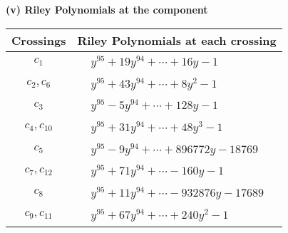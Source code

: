 \documentclass[1p]{elsarticle_modified}
\theoremstyle{definition}
\begin{document}
\newpage\renewcommand{\arraystretch}{1}
\flushleft \textbf{(v) Riley Polynomials at the component}\newline \\
\begin{tabular}{m{50pt}|m{274pt}}
Crossings & \hspace{64pt}Riley Polynomials at each crossing \\
\hline $$\begin{aligned}c_{1}\end{aligned}$$&$\begin{aligned}
&y^{95}+19 y^{94}+\cdots+16 y-1
\end{aligned}$\\
\hline $$\begin{aligned}c_{2},c_{6}\end{aligned}$$&$\begin{aligned}
&y^{95}+43 y^{94}+\cdots+8 y^2-1
\end{aligned}$\\
\hline $$\begin{aligned}c_{3}\end{aligned}$$&$\begin{aligned}
&y^{95}-5 y^{94}+\cdots+128 y-1
\end{aligned}$\\
\hline $$\begin{aligned}c_{4},c_{10}\end{aligned}$$&$\begin{aligned}
&y^{95}+31 y^{94}+\cdots+48 y^3-1
\end{aligned}$\\
\hline $$\begin{aligned}c_{5}\end{aligned}$$&$\begin{aligned}
&y^{95}-9 y^{94}+\cdots+896772 y-18769
\end{aligned}$\\
\hline $$\begin{aligned}c_{7},c_{12}\end{aligned}$$&$\begin{aligned}
&y^{95}+71 y^{94}+\cdots-160 y-1
\end{aligned}$\\
\hline $$\begin{aligned}c_{8}\end{aligned}$$&$\begin{aligned}
&y^{95}+11 y^{94}+\cdots-932876 y-17689
\end{aligned}$\\
\hline $$\begin{aligned}c_{9},c_{11}\end{aligned}$$&$\begin{aligned}
&y^{95}+67 y^{94}+\cdots+240 y^2-1
\end{aligned}$\\
\hline
\end{tabular}\\~\\
\end{document}
